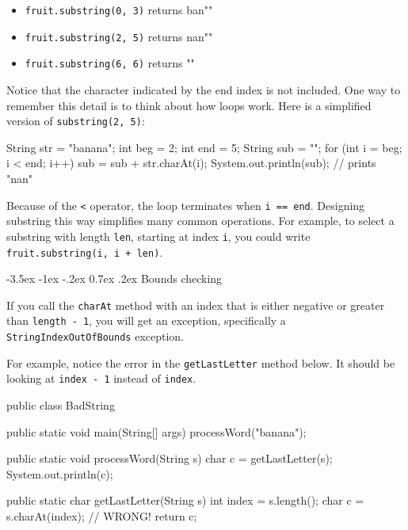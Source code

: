 \documentclass[12pt]{book}
\makeatletter
\theoremstyle{exercise}
\newcommand{\java}[1]{\verb"#1"}
\renewcommand{\section}{\@startsection{section}{1}{\z@}%
    {-3.5ex \@plus -1ex \@minus -.2ex}%
    {0.7ex \@plus.2ex}%
    {\normalfont\Large\bfseries}}
\newcommand{\java}[1]{\lstinline{#1}} %
\makeatother
\begin{document}
\begin{itemize}
\item \java{fruit.substring(0, 3)} returns \java{"ban"}
\item \java{fruit.substring(2, 5)} returns \java{"nan"}
\item \java{fruit.substring(6, 6)} returns \java{""}
\end{itemize}

Notice that the character indicated by the end index is not included.
One way to remember this detail is to think about how loops work.
Here is a simplified version of \java{substring(2, 5)}:

\begin{code}
    String str = "banana";
    int beg = 2;
    int end = 5;
    String sub = "";
    for (int i = beg; i < end; i++) {
        sub = sub + str.charAt(i);
    }
    System.out.println(sub);  // prints "nan"
\end{code}

Because of the \java{<} operator, the loop terminates when \java{i == end}.
Designing substring this way simplifies many common operations.
For example, to select a substring with length \java{len}, starting at index \java{i}, you could write \java{fruit.substring(i, i + len)}.


\section{Bounds checking}
\label{StringIndexOutOfBounds}


If you call the \java{charAt} method with an index that is either negative or greater than \java{length - 1}, you will get an exception, specifically a \java{StringIndexOutOfBounds} exception.

For example, notice the error in the \java{getLastLetter} method below.
It should be looking at \java{index - 1} instead of \java{index}.

\begin{code}
public class BadString {
    public static void main(String[] args) {
        processWord("banana");
    }

    public static void processWord(String s) {
        char c = getLastLetter(s);
        System.out.println(c);
    }

    public static char getLastLetter(String s) {
        int index = s.length();
        char c = s.charAt(index);  // WRONG!
        return c;
    }
}
\end{code}
\end{document}
